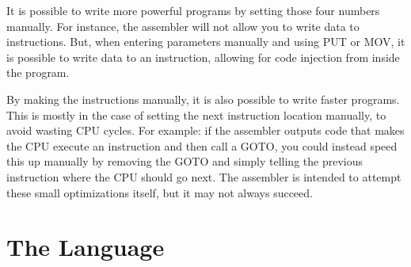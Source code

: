 \documentclass[12pt]{article}
\begin{document}
It is possible to write more powerful programs by setting those four numbers manually. For instance,
the assembler will not allow you to write data to instructions. But, when entering parameters manually and using PUT or MOV, it is possible
to write data to an instruction, allowing for code injection from inside the program.

By making the instructions manually, it is also possible to write faster programs.
This is mostly in the case of setting the next instruction location manually, to avoid wasting CPU cycles.
For example: if the assembler outputs code that makes the CPU execute an instruction and then call a GOTO,
you could instead speed this up manually by removing the GOTO and simply telling the previous instruction where
the CPU should go next. The assembler is intended to attempt these small optimizations itself, but it may not always succeed.

\section{The Language}
\end{document}
